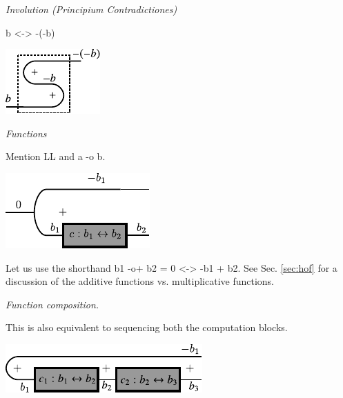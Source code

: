\documentclass[preprint]{sigplanconf}
\begin{document}
\emph{Involution (Principium Contradictiones)}

{{b <-> -(-b)}}

\begin{center}
  \includegraphics{diagrams/double_neg.pdf}
\end{center}

\emph{Functions}

Mention LL and {{a -o b}}.

\begin{center}
  \includegraphics{diagrams/function.pdf}
\end{center}

Let us use the shorthand {{b1 -o+ b2 = 0 <-> -b1 + b2}}. See
Sec. \ref{sec:hof} for a discussion of the additive functions
vs. multiplicative functions.

\emph{Function composition.}

\begin{multicols}{2}

\end{multicols}
This is also equivalent to sequencing both the computation blocks. 

\begin{center}
  \includegraphics{diagrams/compose2.pdf}
\end{center}
\end{document}
